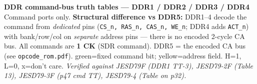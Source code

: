 \documentclass[9pt]{extarticle}
\begin{document}
\begin{center}
{\LARGE\textbf{DDR command-bus truth tables --- DDR1 / DDR2 / DDR3 / DDR4}}\\[2pt]
{\small Command ports only. \textbf{Structural difference vs DDR5:} DDR1--4 decode the command from
\emph{dedicated} pins (\texttt{CS\_n, RAS\_n, CAS\_n, WE\_n}; DDR4 adds \texttt{ACT\_n}) with bank/row/col
on \emph{separate} address pins --- there is no encoded 2-cycle CA bus. All commands are \textbf{1 CK}
(SDR command). DDR5 = the encoded CA bus (see \texttt{opcode\_rom.pdf}).
\colorbox{opc}{green}=fixed command bit; \colorbox{fld}{yellow}=address field. H=1, L=0, x=don't care.
\emph{Verified against JESD79F (DDR1 TT-3), JESD79-2F (Table 13), JESD79-3F (p47 cmd TT),
JESD79-4 (Table on p32).}}
\end{center}
\end{document}
